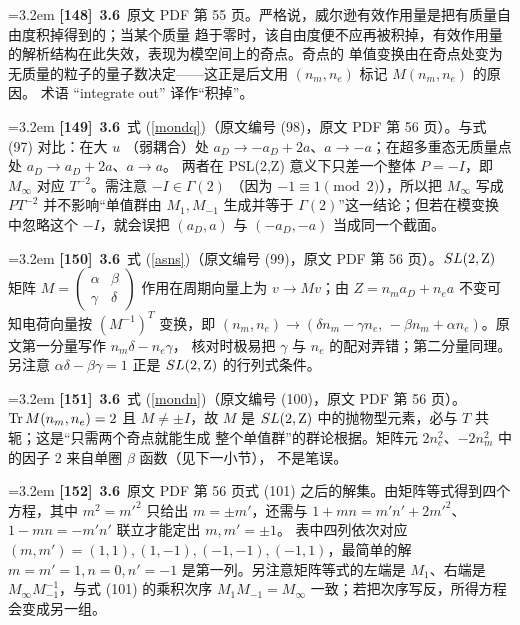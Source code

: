 \par
\par\medskip\noindent\hangindent=3.2em \textbf{[148]}~\textbf{3.6}~原文 PDF 第 55 页。严格说，威尔逊有效作用量是把有质量自由度积掉得到的；当某个质量  趋于零时，该自由度便不应再被积掉，有效作用量的解析结构在此失效，表现为模空间上的奇点。奇点的  单值变换由在奇点处变为无质量的粒子的量子数决定——这正是后文用 $(n_m,n_e)$ 标记 $M(n_m,n_e)$ 的原因。  术语 “integrate out” 译作“积掉”。
\par
\par\medskip\noindent\hangindent=3.2em \textbf{[149]}~\textbf{3.6}~式 (\ref{mondq})（原文编号 (98)，原文 PDF 第 56 页）。与式 (97) 对比：在大 $u$  （弱耦合）处 $a_D\to -a_D+2a$、$a\to -a$；在超多重态无质量点处 $a_D\to a_D+2a$、$a\to a$。  两者在 PSL(2,Z) 意义下只差一个整体 $P=-I$，即 $M_\infty$ 对应 $T^{-2}$。需注意 $-I\in\Gamma(2)$  （因为 $-1\equiv 1\pmod 2$），所以把 $M_\infty$ 写成 $PT^{-2}$ 并不影响“单值群由 $M_1,M_{-1}$  生成并等于 $\Gamma(2)$”这一结论；但若在模变换中忽略这个 $-I$，就会误把 $(a_D,a)$ 与  $(-a_D,-a)$ 当成同一个截面。
\par
\par\medskip\noindent\hangindent=3.2em \textbf{[150]}~\textbf{3.6}~式 (\ref{asns})（原文编号 (99)，原文 PDF 第 56 页）。$SL(2,{\rm Z})$ 矩阵  $M=\left(\begin{smallmatrix}\alpha&\beta\\ \gamma&\delta\end{smallmatrix}\right)$ 作用在周期向量上为  $v\to Mv$；由 $Z=n_ma_D+n_ea$ 不变可知电荷向量按 $(M^{-1})^T$ 变换，即  $(n_m,n_e)\to(\delta n_m-\gamma n_e,\,-\beta n_m+\alpha n_e)$。原文第一分量写作 $n_m\delta-n_e\gamma$，  核对时极易把 $\gamma$ 与 $n_e$ 的配对弄错；第二分量同理。另注意 $\alpha\delta-\beta\gamma=1$  正是 $SL(2,{\rm Z})$ 的行列式条件。
\par
\par\medskip\noindent\hangindent=3.2em \textbf{[151]}~\textbf{3.6}~式 (\ref{mondn})（原文编号 (100)，原文 PDF 第 56 页）。${\rm Tr}\,M(n_m,n_e)=2$ 且  $M\ne\pm I$，故 $M$ 是 $SL(2,{\rm Z})$ 中的抛物型元素，必与 $T$ 共轭；这是“只需两个奇点就能生成  整个单值群”的群论根据。矩阵元 $2n_e^2$、$-2n_m^2$ 中的因子 2 来自单圈 $\beta$ 函数（见下一小节），  不是笔误。
\par
\par\medskip\noindent\hangindent=3.2em \textbf{[152]}~\textbf{3.6}~原文 PDF 第 56 页式 (101) 之后的解集。由矩阵等式得到四个方程，其中 $m^2=m'^2$  只给出 $m=\pm m'$，还需与 $1+mn=m'n'+2m'^2$、$1-mn=-m'n'$ 联立才能定出 $m,m'=\pm 1$。  表中四列依次对应 $(m,m')=(1,1),(1,-1),(-1,-1),(-1,1)$，最简单的解 $m=m'=1,n=0,n'=-1$  是第一列。另注意矩阵等式的左端是 $M_1$、右端是 $M_\infty M_{-1}^{-1}$，与式 (101) 的乘积次序  $M_1M_{-1}=M_\infty$ 一致；若把次序写反，所得方程会变成另一组。
